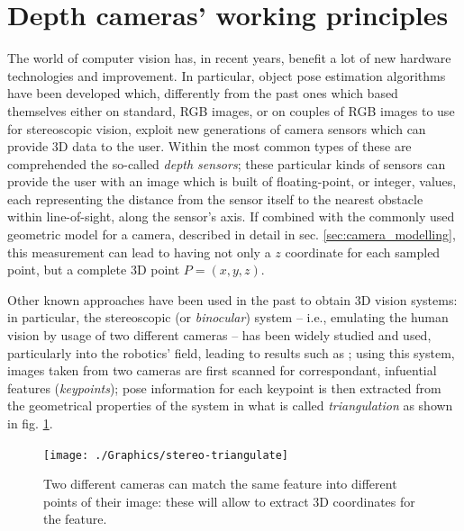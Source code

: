 \section{Depth cameras' working principles}

The world of computer vision has, in recent years, benefit a lot of new hardware
technologies and improvement. In particular, object pose estimation algorithms
have been developed which, differently from the past ones which based themselves
either on standard, RGB images, or on couples of RGB images to use for
stereoscopic vision, exploit new generations of camera sensors which can provide
3D data to the user. Within the most common types of these are comprehended the
so-called \emph{depth sensors}; these particular kinds of sensors can provide
the user with an image which is built of floating-point, or integer, values,
each representing the distance from the sensor itself to the nearest obstacle
within line-of-sight, along the sensor's axis. If combined with the commonly
used geometric model for a camera, described in detail in sec.
\ref{sec:camera_modelling}, this measurement can lead to having not only a $z$
coordinate for each sampled point, but a complete 3D point $P=(x,y,z)$.

Other known approaches have been used in the past to obtain 3D vision systems:
in particular, the stereoscopic (or \emph{binocular}) system -- i.e., emulating the human vision by usage
of two different cameras -- has been widely studied and used, particularly into
the robotics' field, leading to
results such as \cite{stereo-vision-robot}; using this system, images taken
from two cameras are first scanned for correspondant, infuential features
(\emph{keypoints}); pose information for each keypoint is then extracted from
the geometrical properties of the system in what is called \emph{triangulation}
as shown in fig. \ref{fig:stereo-triangulate}.

\begin{figure}[htbp]
\centering
\texttt{[image: ./Graphics/stereo-triangulate]}
\caption{Two different cameras can match the same feature into different points
of their image: these will allow to extract 3D coordinates for the feature.\label{fig:stereo-triangulate}}
\end{figure}

